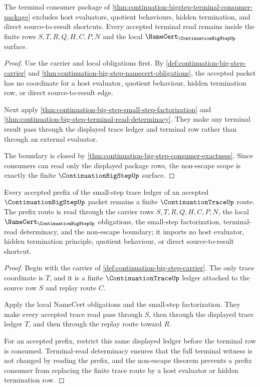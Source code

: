 \begin{theorem}
\label{thm:continuation-bigstep-nonescape-scope-package}
The terminal consumer package of \autoref{thm:continuation-bigstep-terminal-consumer-package} excludes host evaluators, quotient behaviours, hidden termination, and direct source-to-result shortcuts. Every accepted terminal read remains inside the finite rows $S,T,R,Q,H,C,P,N$ and the local $\NameCert_{\ContinuationBigStepUp}$ surface.
\end{theorem}
\begin{proof}
Use the carrier and local obligations first. By \autoref{def:continuation-big-step-carrier} and \autoref{thm:continuation-big-step-namecert-obligations}, the accepted packet has no coordinate for a host evaluator, quotient behaviour, hidden termination row, or direct source-to-result edge.

Next apply \autoref{thm:continuation-big-step-small-step-factorization} and \autoref{thm:continuation-big-step-terminal-read-determinacy}. They make any terminal result pass through the displayed trace ledger and terminal row rather than through an external evaluator.

The boundary is closed by \autoref{thm:continuation-big-step-consumer-exactness}. Since consumers can read only the displayed package rows, the non-escape scope is exactly the finite $\ContinuationBigStepUp$ surface.
\end{proof}

\begin{theorem}
\label{thm:continuation-big-step-prefix-closure}
Every accepted prefix of the small-step trace ledger of an accepted $\ContinuationBigStepUp$ packet remains a finite $\ContinuationTraceUp$ route. The prefix route is read through the carrier rows $S,T,R,Q,H,C,P,N$, the local $\NameCert_{\ContinuationBigStepUp}$ obligations, the small-step factorization, terminal-read determinacy, and the non-escape boundary; it imports no host evaluator, hidden termination principle, quotient behaviour, or direct source-to-result shortcut.
\end{theorem}
\begin{proof}
Begin with the carrier of \autoref{def:continuation-big-step-carrier}. The only trace coordinate is $T$, and it is a finite $\ContinuationTraceUp$ ledger attached to the source row $S$ and replay route $C$.

Apply the local NameCert obligations and the small-step factorization. They make every accepted trace read pass through $S$, then through the displayed trace ledger $T$, and then through the replay route toward $R$.

For an accepted prefix, restrict this same displayed ledger before the terminal row is consumed. Terminal-read determinacy ensures that the full terminal witness is not changed by reading the prefix, and the non-escape theorem prevents a prefix consumer from replacing the finite trace route by a host evaluator or hidden termination row.
\end{proof}

